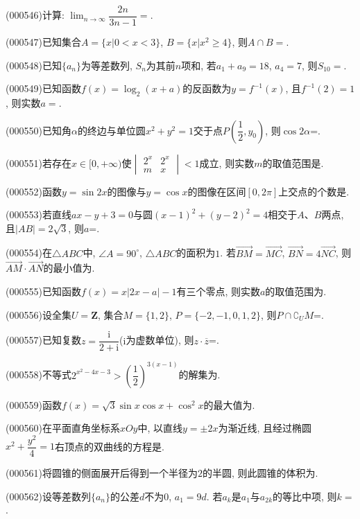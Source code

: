 \item (000546)计算: $\displaystyle\lim_{n\to\infty}\dfrac{2n}{3n-1}=$.
\item (000547)已知集合$A=\{x|0<x<3\}$, $B=\{x|x^2\ge 4\}$, 则$A\cap B=$.
\item (000548)已知$\{a_n\}$为等差数列, $S_n$为其前$n$项和, 若$a_1+a_9=18$, $a_4=7 $, 则$S_{10}=$.
\item (000549)已知函数$f(x)=\log_2(x+a)$的反函数为$y=f^{-1}(x)$, 且$f^{-1}(2)=1$, 则实数$a=$.
\item (000550)已知角$\alpha$的终边与单位圆$x^2+y^2=1$交于点$P(\dfrac12,y_0)$, 则$\cos 2 \alpha$=.
\item (000551)若存在$x\in [0,+\infty)$使$\begin{vmatrix}2^x & 2^x \\ m & x \end{vmatrix}<1$成立, 则实数$m$的取值范围是.
\item (000552)函数$y=\sin 2x$的图像与$y=\cos x$的图像在区间$[0,2\pi]$上交点的个数是.
\item (000553)若直线$ax-y+3=0$与圆$(x-1)^2+(y-2)^2=4$相交于$A$、$B$两点, 且$|AB|=2 \sqrt3$, 则$a$=.
\item (000554)在$\triangle ABC$中, $\angle A=90^\circ $, $\triangle ABC$的面积为$1$. 若$\overrightarrow{BM}=\overrightarrow{MC}$, $\overrightarrow{BN}=4 \overrightarrow{NC}$, 则$\overrightarrow{AM}\cdot \overrightarrow{AN}$的最小值为.
\item (000555)已知函数$f(x)=x|2x-a|-1$有三个零点, 则实数$a$的取值范围为.
\item (000556)设全集$U=\mathbf{Z}$, 集合$M=\{1,2\}$, $P=\{-2,-1,0,1,2\}$, 则$P\cap \complement_U M$=.
\item (000557)已知复数$z=\dfrac{\mathrm{i}}{2+\mathrm{i}}$($\mathrm{i}$为虚数单位), 则$z\cdot \overline z$=.
\item (000558)不等式$2^{x^2-4x-3}>(\dfrac12 )^{3(x-1)}$的解集为.
\item (000559)函数$f(x)=\sqrt3\sin x\cos x+\cos^2x$的最大值为.
\item (000560)在平面直角坐标系$xOy$中, 以直线$y=\pm 2x$为渐近线, 且经过椭圆$x^2+\dfrac{y^2}4=1$右顶点的双曲线的方程是.
\item (000561)将圆锥的侧面展开后得到一个半径为$2$的半圆, 则此圆锥的体积为.
\item (000562)设等差数列$\{a_n\}$的公差$d$不为$0$, $a_1=9d$. 若$a_k$是$a_1$与$a_{2k}$的等比中项, 则$k=$.
